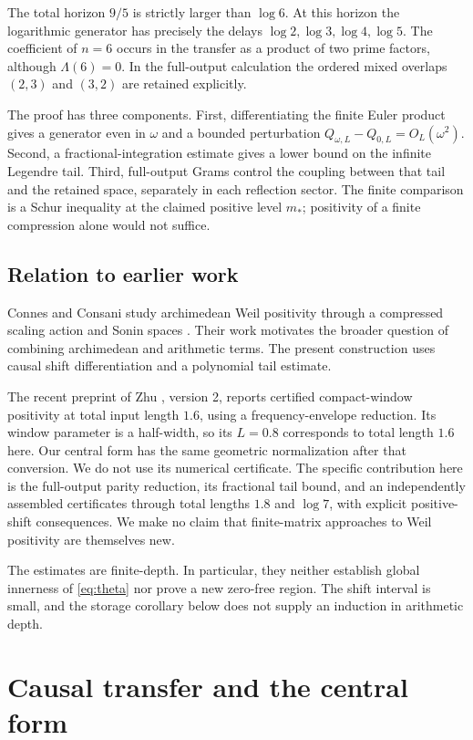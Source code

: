 \documentclass[11pt]{article}
\numberwithin{equation}{section}
\theoremstyle{definition}
\theoremstyle{remark}
\newcommand{\mstar}{m_*}
\begin{document}
The total horizon $9/5$ is strictly larger than $\log6$. At this horizon
the logarithmic generator has precisely the delays $\log2,\log3,\log4,\log5$.
The coefficient of $n=6$ occurs in the transfer as a product of two prime
factors, although $\Lambda(6)=0$. In the full-output calculation the ordered
mixed overlaps $(2,3)$ and $(3,2)$ are retained explicitly.

The proof has three components. First, differentiating the finite Euler
product gives a generator even in $\omega$ and a bounded perturbation
$Q_{\omega,L}-Q_{0,L}=O_L(\omega^2)$. Second, a fractional-integration estimate
gives a lower bound on the infinite Legendre tail. Third, full-output Grams
control the coupling between that tail and the retained space, separately in
each reflection sector. The finite comparison is a Schur inequality at the
claimed positive level $\mstar$; positivity of a finite compression alone
would not suffice.

\subsection{Relation to earlier work}

Connes and Consani study archimedean Weil positivity through a compressed
scaling action and Sonin spaces \cite{ConnesConsani2020}. Their work motivates
the broader question of combining archimedean and arithmetic terms.
The present construction uses causal shift differentiation and a polynomial
tail estimate.

The recent preprint of Zhu \cite{Zhu2026}, version 2, reports certified
compact-window positivity at total input length $1.6$, using a
frequency-envelope reduction. Its window parameter is a half-width, so its
$L=0.8$ corresponds to total length $1.6$ here. Our central form has the same
geometric normalization after that conversion. We do not use its numerical
certificate. The specific contribution here is the full-output parity
reduction, its fractional tail bound, and an independently assembled
certificates through total lengths $1.8$ and $\log7$, with explicit positive-shift
consequences. We make no claim that finite-matrix approaches to Weil
positivity are themselves new.

The estimates are finite-depth. In particular, they neither establish global
innerness of \eqref{eq:theta} nor prove a new zero-free region. The shift
interval is small, and the storage corollary below does not supply an induction
in arithmetic depth.

\section{Causal transfer and the central form}\label{sec:operators}
\end{document}
